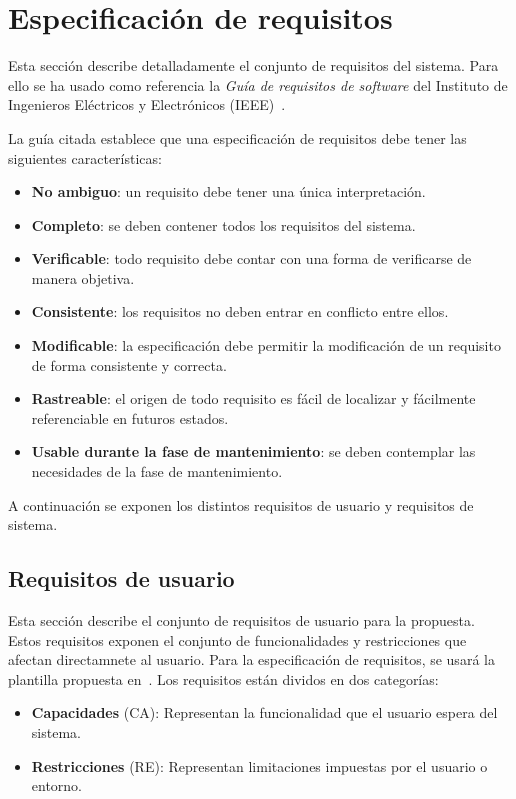 \section{Especificación de requisitos}\label{sec:requirements}

Esta sección describe detalladamente el conjunto de requisitos del sistema. Para ello se ha usado como referencia la \textit{Guía de requisitos de software} del Instituto de Ingenieros Eléctricos y Electrónicos (IEEE)~\cite{requirements}.

La guía citada establece que una especificación de requisitos debe tener las siguientes características:
\begin{itemize}
\item \textbf{No ambiguo}: un requisito debe tener una única interpretación.
\item \textbf{Completo}: se deben contener todos los requisitos del sistema.
\item \textbf{Verificable}: todo requisito debe contar con una forma de verificarse de manera objetiva.
\item \textbf{Consistente}: los requisitos no deben entrar en conflicto entre ellos.
\item \textbf{Modificable}: la especificación debe permitir la modificación de un requisito de forma consistente y correcta.
\item \textbf{Rastreable}: el origen de todo requisito es fácil de localizar y fácilmente referenciable en futuros estados.
\item \textbf{Usable durante la fase de mantenimiento}: se deben contemplar las necesidades de la fase de mantenimiento.
\end{itemize}

A continuación se exponen los distintos requisitos de usuario y requisitos de sistema.

\subsection{Requisitos de usuario}\label{subsec:user-req}

Esta sección describe el conjunto de requisitos de usuario para la propuesta.
Estos requisitos exponen el conjunto de funcionalidades y restricciones que
afectan directamnete al usuario. Para la especificación de requisitos, se usará
la plantilla propuesta en~\cite{luisda}. Los requisitos están dividos en dos
categorías:

\begin{itemize}
\item \textbf{Capacidades} (CA): Representan la funcionalidad que el usuario espera del sistema.
\item \textbf{Restricciones} (RE): Representan limitaciones impuestas por el usuario o entorno.
\end{itemize}

